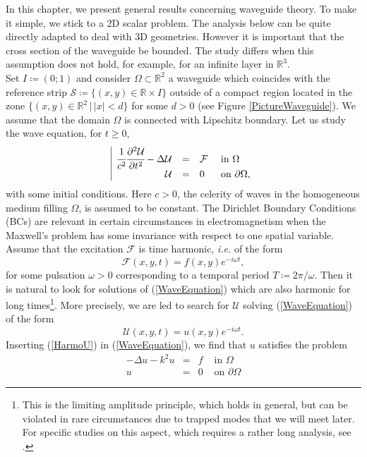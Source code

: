 \documentclass[11pt,a4paper]{report}
\newcommand{\om}{\omega}
\newcommand{\Om}{\Omega}
\newcommand{\R}{\mathbb{R}}
\begin{document}
\noindent In this chapter, we present general results concerning waveguide theory. To make it simple, we stick to a 2D scalar problem. The analysis below can be quite directly adapted to deal with 3D geometries. However it is important that the cross section of the waveguide be bounded. The study differs when this assumption does not hold, for example, for an infinite layer in $\R^3$.\\
\newline
Set $I\coloneqq(0;1)$ and consider $\Om\subset\R^2$ a waveguide which coincides with the reference strip $\mathcal{S}\coloneqq\{(x,y)\in\R\times I\}$ outside of a compact region located in the zone $\{(x,y)\in\R^2\,|\,|x|<d\}$ for some $d>0$ (see Figure \ref{PictureWaveguide}). We assume that the domain $\Om$ is connected with Lipschitz boundary. Let us study the wave equation, for $t\ge0$,
\begin{equation}\label{WaveEquation}
\begin{array}{|rcll}
\cfrac{1}{c^2}\cfrac{\partial^2 \mathcal{U}}{\partial t^2}-\Delta \mathcal{U}&=&\mathcal{F}&\mbox{ in }\Om \\[2pt]
\mathcal{U}&=&0&\mbox{ on }\partial\Om,
\end{array}
\end{equation}
with some initial conditions. Here $c>0$, the celerity of waves in the homogeneous medium filling $\Om$, is assumed to be constant. 
The Dirichlet Boundary Conditions (BCs) are relevant in certain circumstances in electromagnetism when the Maxwell's problem has some invariance with respect to one spatial variable. Assume that the excitation $\mathcal{F}$ is time harmonic, \textit{i.e.} of the form
\[
\mathcal{F}(x,y,t)=f(x,y)e^{-i\om t},
\]
for some pulsation $\om>0$ corresponding to a temporal period $T\coloneqq2\pi/\om$. Then it is natural to look for solutions of (\ref{WaveEquation}) which are also harmonic for long times\footnote{This is the limiting amplitude principle, which holds in general, but can be violated in rare circumstances due to trapped modes that we will meet later. For specific studies on this aspect, which requires a rather long analysis, see \cite{Eidu65,Eidu69,Wede84}.}. More precisely, we are led to search for $\mathcal{U}$ solving (\ref{WaveEquation}) of the form
\begin{equation}\label{HarmoU}
\mathcal{U}(x,y,t)=u(x,y)e^{-i\om t}.
\end{equation}
Inserting (\ref{HarmoU}) in (\ref{WaveEquation}), we find that $u$ satisfies the problem 
\begin{equation}\label{WaveguidePb}
\begin{array}{|rcll}
-\Delta u-k^2u&=&f&\mbox{ in }\Om \\[2pt]
u&=&0&\mbox{ on }\partial\Om
\end{array}
\end{equation}
\end{document}
